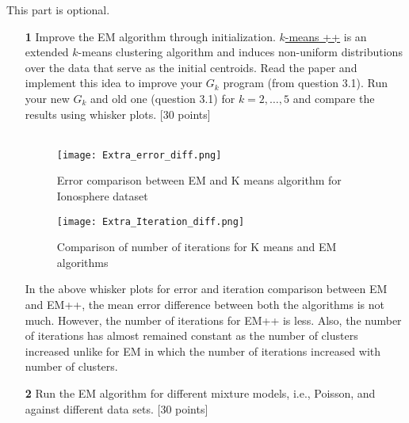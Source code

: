 \documentclass{article}
\begin{document}
This part is optional. 

\begin{enumerate}
\item[\textbf{1}] Improve the EM algorithm  through initialization.  \href{http://ilpubs.stanford.edu:8090/778/1/2006-13.pdf}{$k$-means ++} is an extended $k$-means clustering algorithm and induces non-uniform  distributions over  the data  that serve as  the initial centroids. Read the paper and implement this idea to improve your $G_k$ program (from question 3.1). Run your new $G_k$ and old one (question 3.1) for $k= 2,\dots,5$ and compare the results using whisker plots. [30 points]
\\ 
\\
\begin{figure}[H]
       \texttt{[image: Extra\_error\_diff.png]}
       \caption{Error comparison between EM and K means algorithm for Ionosphere dataset}
      \end{figure}

      \begin{figure}[H]
        \texttt{[image: Extra\_Iteration\_diff.png]}
        \caption{Comparison of number of iterations for K means and EM algorithms}
      \end{figure}

In the above whisker plots for error and iteration comparison between EM and EM++, the mean error difference between both the algorithms is not much. However, the number of iterations for EM++ is less. Also, the number of iterations has almost remained constant as the number of clusters increased unlike for EM in which the number of iterations increased with number of clusters.


\item[\textbf{2}]  Run the EM algorithm for different mixture models, i.e., Poisson,  and against different data sets. [30 points]
\end{enumerate}






\end{document}
